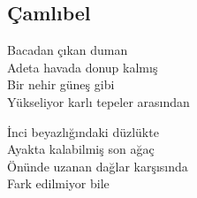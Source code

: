 \subsection{Çamlıbel}

Bacadan çıkan duman \\
Adeta havada donup kalmış \\
Bir nehir güneş gibi \\
Yükseliyor karlı tepeler arasından

\noindent\newline
İnci beyazlığındaki düzlükte \\
Ayakta kalabilmiş son ağaç \\
Önünde uzanan dağlar karşısında \\
Fark edilmiyor bile